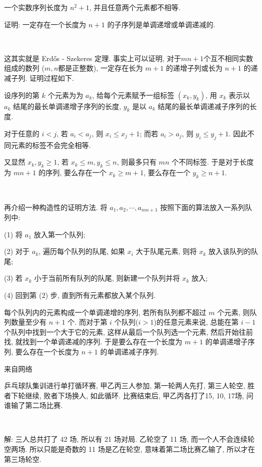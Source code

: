 \newpage
一个实数序列长度为 $n^2 + 1$, 并且任意两个元素都不相等. 

证明: 一定存在一个长度为 $n + 1$ 的子序列是单调递增或单调递减的.

~

这其实就是 Erd\H{o}s - Szekeres 定理. 事实上可以证明, 对于$mn + 1$个互不相同实数组成的数列 ($m,n$都是正整数), 一定存在长为 $m+1$ 的递增子列或长为 $n+1$ 的递减子列. 证明过程如下.

设序列的第 $k$ 个元素为为 $a_k$, 给每个元素赋予一组标签 $(x_k, y_k)$, 用 $x_k$ 表示以 $a_k$ 结尾的最长单调递增子序列的长度, $y_k$ 是以 $a_k$ 结尾的最长单调递减子序列的长度. 

对于任意的 $i < j$, 若 $a_i < a_j$, 则 $x_i \le x_j + 1$; 而若 $a_i > a_j$, 则 $y_i \le y_j + 1$. 因此不同元素的标签不会完全相等. 

又显然 $x_k, y_k \ge 1$, 若 $x_k \le m, y_k \le n$, 则最多只有 $mn$ 个不同标签. 于是对于长度为 $mn + 1$ 的序列, 要么存在一个 $x_k \ge m + 1$, 要么存在一个 $y_k \ge n + 1$.

~

再介绍一种构造性的证明方法. 将 $a_1, a_2, \cdots, a_{mn+1}$ 按照下面的算法放入一系列队列中:

(1) 将 $a_1$ 放入第一个队列;

(2) 对于 $a_k$, 遍历每个队列的队尾, 如果 $x_i$ 大于队尾元素, 则将 $x_k$ 放入该队列的队尾; 

(3) 若 $x_k$ 小于当前所有队列的队尾, 则新建一个队列并将 $x_k$ 放入;

(4) 回到第 (2) 步, 直到所有元素都放入某个队列.

每个队列内的元素构成一个单调递增的序列, 若所有队列都不超过 $m$ 个元素, 则队列数量至少有 $n + 1$ 个. 而对于第 $i$ 个队列($i > 1$)的任意元素来说, 总能在第 $i - 1$ 个队列中找到一个大于它的元素, 这样从最后一个队列选一个元素, 然后开始往前找, 就找到一个单调递减的序列. 于是要么存在一个长度为 $m + 1$ 的单调递增子序列, 要么存在一个长度为 $n + 1$ 的单调递减子序列.

\newpage
\noindent 来自网络

乒乓球队集训进行单打循环赛, 甲乙丙三人参加, 第一轮两人先打, 第三人轮空, 胜者下轮继续, 败者下场换人, 如此循环. 比赛结束后, 甲乙丙各打了15, 10, 17场, 问谁输了第二场比赛.

~

解: 三人总共打了 42 场, 所以有 21 场对局. 乙轮空了 11 场, 而一个人不会连续轮空两场. 所以只能是奇数的 11 场是乙在轮空, 意味着第二场比赛乙输了, 所以才在第三场轮空.


